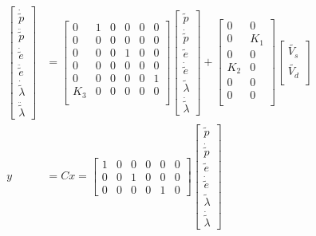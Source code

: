 \begin{align*}
\\
\begin{bmatrix}
    \dot{\tilde{p}}\\
    \ddot{\tilde{p}}\\
    \dot{\tilde{e}}\\
    \ddot{\tilde{e}}\\
    \dot{\tilde{\lambda}}\\
    \ddot{\tilde{\lambda}}
\end{bmatrix} &= 
\begin{bmatrix}
    0 & 1 & 0 & 0 & 0 & 0\\
    0 & 0 & 0 & 0 & 0 & 0\\
    0 & 0 & 0 & 1 & 0 & 0\\
    0 & 0 & 0 & 0 & 0 & 0\\
    0 & 0 & 0 & 0 & 0 & 1\\
    K_3 & 0 & 0 & 0 & 0 & 0\\
\end{bmatrix}
\begin{bmatrix}
    \tilde{p}\\
    \dot{\tilde{p}}\\
    \tilde{e}\\
    \dot{\tilde{e}}\\
    \tilde{\lambda}\\
    \dot{\tilde{\lambda}}
\end{bmatrix} + 
\begin{bmatrix}
    0 & 0\\
    0 & K_1\\
    0 & 0\\
    K_2 & 0\\
    0 & 0\\
    0 & 0\\
\end{bmatrix}
\begin{bmatrix}
    \tilde{V_s}\\
    \tilde{V_d}\\
\end{bmatrix}
\\
y &= Cx = 
\begin{bmatrix}
    1 & 0 & 0 & 0 & 0 & 0\\
    0 & 0 & 1 & 0 & 0 & 0\\
    0 & 0 & 0 & 0 & 1 & 0
\end{bmatrix}
\begin{bmatrix}
    \tilde{p}\\
    \dot{\tilde{p}}\\
    \tilde{e}\\
    \dot{\tilde{e}}\\
    \tilde{\lambda}\\
    \dot{\tilde{\lambda}}
\end{bmatrix}
\end{align*}



